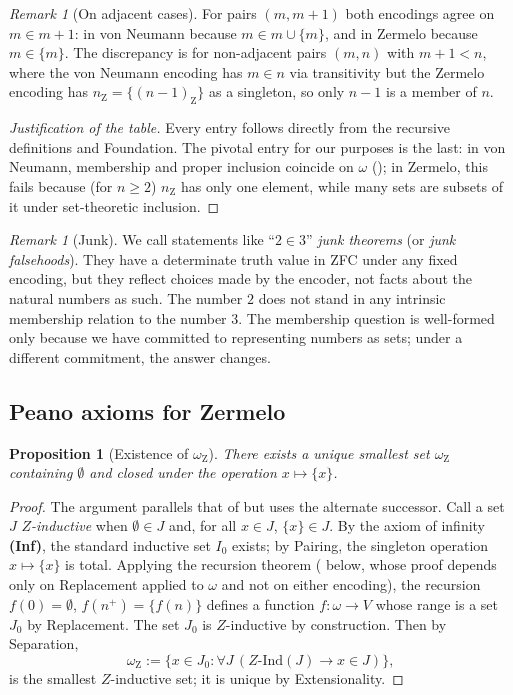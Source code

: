 \documentclass[12pt]{article}
\newtheorem{proposition}[theorem]{Proposition}
\theoremstyle{definition}
\theoremstyle{remark}
\newtheorem{remark}[theorem]{Remark}
\begin{document}
\begin{remark}[On adjacent cases]
For pairs $(m, m+1)$ both encodings agree on $m \in m+1$: in von Neumann
because $m \in m \cup \{m\}$, and in Zermelo because $m \in \{m\}$. The
discrepancy is for non-adjacent pairs $(m, n)$ with $m + 1 < n$, where the
von Neumann encoding has $m \in n$ via transitivity but the Zermelo encoding
has $n_{\mathrm{Z}} = \{(n-1)_{\mathrm{Z}}\}$ as a singleton, so only $n - 1$ is
a member of $n$.
\end{remark}

\begin{proof}[Justification of the table]
Every entry follows directly from the recursive definitions and Foundation.
The pivotal entry for our purposes is the last: in von Neumann, membership
and proper inclusion coincide on $\omega$ (); in
Zermelo, this fails because (for $n \geq 2$) $n_{\mathrm{Z}}$ has only one
element, while many sets are subsets of it under set-theoretic inclusion.
\end{proof}

\begin{remark}[Junk]
We call statements like ``$2 \in 3$'' \emph{junk theorems} (or
\emph{junk falsehoods}). They have a determinate truth value in ZFC under any
fixed encoding, but they reflect choices made by the encoder, not facts
about the natural numbers as such. The number $2$ does not stand in any
intrinsic membership relation to the number $3$. The membership question is
well-formed only because we have committed to representing numbers as sets;
under a different commitment, the answer changes.
\end{remark}

\subsection{Peano axioms for Zermelo}

\begin{proposition}[Existence of $\omega_{\mathrm{Z}}$]\label{prop:omega-Z}
There exists a unique smallest set $\omega_{\mathrm{Z}}$ containing
$\emptyset$ and closed under the operation $x \mapsto \{x\}$.
\end{proposition}

\begin{proof}
The argument parallels that of  but uses the alternate
successor. Call a set $J$ \emph{$Z$-inductive} when $\emptyset \in J$ and,
for all $x \in J$, $\{x\} \in J$. By the axiom of infinity \textbf{(Inf)},
the standard inductive set $I_0$ exists; by Pairing, the singleton operation
$x \mapsto \{x\}$ is total. Applying the recursion theorem
( below, whose proof depends only on Replacement
applied to $\omega$ and not on either encoding), the recursion
$f(0) = \emptyset$, $f(n^+) = \{f(n)\}$ defines a function $f: \omega \to V$
whose range is a set $J_0$ by Replacement. The set $J_0$ is $Z$-inductive
by construction. Then by Separation,
\[
\omega_{\mathrm{Z}} := \{x \in J_0 : \forall J\,(\text{$Z$-Ind}(J) \to x \in J)\},
\]
is the smallest $Z$-inductive set; it is unique by Extensionality.
\end{proof}
\end{document}

